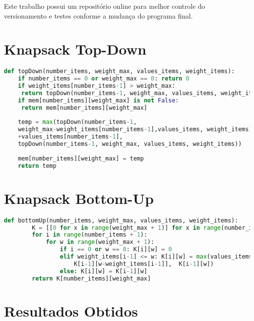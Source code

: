 \documentclass[a4paper, 12pt]{article}
\begin{document}
Este trabalho possui um repositório online para melhor controle do versionamento e testes conforme a mudança do programa final.
\href{}{}
\newpage

\section{Knapsack Top-Down}
\begin{lstlisting}[basicstyle=\footnotesize, language=Python]
def topDown(number_items, weight_max, values_items, weight_items):
    if number_items == 0 or weight_max == 0: return 0
    if weight_items[number_items-1] > weight_max: 
     return topDown(number_items-1, weight_max, values_items, weight_items)
    if mem[number_items][weight_max] is not False: 
     return mem[number_items][weight_max]
    
    temp = max(topDown(number_items-1, 
    weight_max-weight_items[number_items-1],values_items, weight_items)
    +values_items[number_items-1], 
    topDown(number_items-1, weight_max, values_items, weight_items))
    
    mem[number_items][weight_max] = temp
    return temp    
\end{lstlisting}

\newpage
\section{Knapsack Bottom-Up}
\begin{lstlisting}[basicstyle=\footnotesize, language=Python]
    def bottomUp(number_items, weight_max, values_items, weight_items): 
        K = [[0 for x in range(weight_max + 1)] for x in range(number_items + 1)]
        for i in range(number_items + 1): 
            for w in range(weight_max + 1): 
                if i == 0 or w == 0: K[i][w] = 0
                elif weight_items[i-1] <= w: K[i][w] = max(values_items[i-1] + 
                    K[i-1][w-weight_items[i-1]],  K[i-1][w]) 
                else: K[i][w] = K[i-1][w] 
        return K[number_items][weight_max]
    \end{lstlisting}
\newpage    

\section{Resultados Obtidos}
\end{document}
